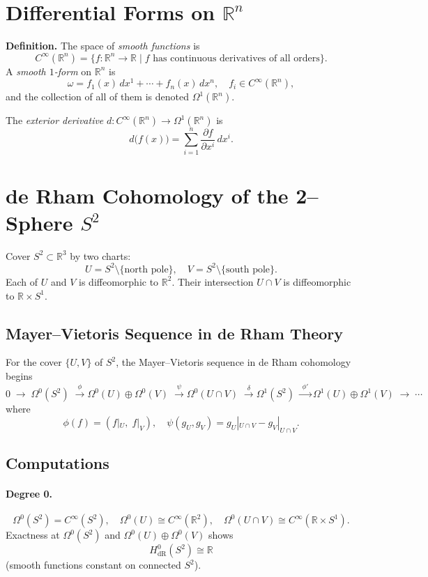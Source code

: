 \documentclass[12pt]{article}
\newcommand{\R}{\mathbb{R}}
\begin{document}
	\section{Differential Forms on \(\R^n\)}
	
	\textbf{Definition.}
		The space of \emph{smooth functions} is
		\[
		C^\infty(\R^n)
		=\bigl\{f:\R^n\to\R\mid f\text{ has continuous derivatives of all orders}\bigr\}.
		\]
		A \emph{smooth \(1\)-form} on \(\R^n\) is
		\[
		\omega
		= f_1(x)\,dx^1 + \cdots + f_n(x)\,dx^n,
		\quad f_i\in C^\infty(\R^n),
		\]
		and the collection of all of them is denoted \(\Omega^1(\R^n)\).
	
	The \emph{exterior derivative} \(d:C^\infty(\R^n)\to\Omega^1(\R^n)\) is
	\[
	d\bigl(f(x)\bigr)
	=\sum_{i=1}^n \frac{\partial f}{\partial x^i}\,dx^i.
	\]
	
	\section{de Rham Cohomology of the 2–Sphere \(S^2\)}
	
	Cover \(S^2\subset\R^3\) by two charts:
	\[
	U = S^2\setminus\{\text{north pole}\}, 
	\quad
	V = S^2\setminus\{\text{south pole}\}.
	\]
	Each of \(U\) and \(V\) is diffeomorphic to \(\R^2\).  Their intersection
	\(U\cap V\) is diffeomorphic to \(\R\times S^1\).
	
	\subsection{Mayer–Vietoris Sequence in de Rham Theory}
	
	For the cover \(\{U,V\}\) of \(S^2\), the Mayer–Vietoris sequence in de Rham cohomology begins
	\[
	0 \;\longrightarrow\; \Omega^0(S^2)
	\;\xrightarrow{\;\phi\;}
	\Omega^0(U)\oplus\Omega^0(V)
	\;\xrightarrow{\;\psi\;}
	\Omega^0(U\cap V)
	\;\xrightarrow{\;\delta\;}
	\Omega^1(S^2)
	\;\xrightarrow{\;\phi'\;}
	\Omega^1(U)\oplus\Omega^1(V)
	\;\rightarrow\;\cdots
	\]
	where
	\[
	\phi(f) = (f|_U,\;f|_V),
	\quad
	\psi(g_U,g_V) = g_U|_{U\cap V} - g_V|_{U\cap V}.
	\]
	
	\subsection{Computations}
	
	\paragraph{Degree 0.}
	\[
	\Omega^0(S^2)=C^\infty(S^2),
	\quad
	\Omega^0(U)\cong C^\infty(\R^2),
	\quad
	\Omega^0(U\cap V)\cong C^\infty(\R\times S^1).
	\]
	Exactness at \(\Omega^0(S^2)\) and \(\Omega^0(U)\oplus\Omega^0(V)\) shows
	\[
	H^0_{\mathrm{dR}}(S^2)\cong\R
	\]
	(smooth functions constant on connected \(S^2\)).
	
\end{document}
